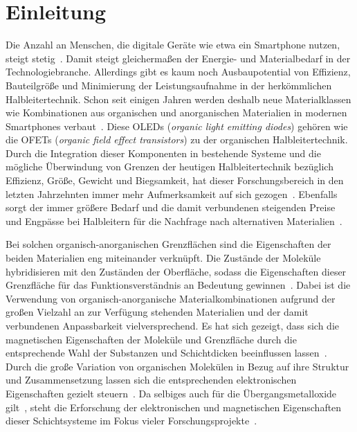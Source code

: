 \chapter{Einleitung}
    Die Anzahl an Menschen, die digitale Geräte wie etwa ein Smartphone nutzen, steigt stetig~\cite{Statista}.
    Damit steigt gleichermaßen der Energie- und Materialbedarf in der Technologiebranche.
    Allerdings gibt es kaum noch Ausbaupotential von Effizienz, Bauteilgröße und Minimierung der Leistungsaufnahme in der herkömmlichen Halbleitertechnik.
    Schon seit einigen Jahren werden deshalb neue Materialklassen wie Kombinationen aus organischen und anorganischen Materialien in modernen Smartphones verbaut~\cite{MAC}.
    Diese OLEDs (\textit{organic light emitting diodes}) gehören wie die OFETs (\textit{organic field effect transistors}) zu der organischen Halbleitertechnik.
    Durch die Integration dieser Komponenten in bestehende Systeme und die mögliche Überwindung von Grenzen der heutigen Halbleitertechnik bezüglich Effizienz, Größe, Gewicht und Biegsamkeit, hat dieser Forschungsbereich in den letzten Jahrzehnten immer mehr Aufmerksamkeit auf sich gezogen~\cite{Uni-Tübingen, IF_15, IF_1}.
    Ebenfalls sorgt der immer größere Bedarf und die damit verbundenen steigenden Preise und Engpässe bei Halbleitern für die Nachfrage nach alternativen Materialien~\cite{Idealo}.

    Bei solchen organisch-anorganischen Grenzflächen sind die Eigenschaften der beiden Materialien eng miteinander verknüpft.
    Die Zustände der Moleküle hybridisieren mit den Zuständen der Oberfläche, sodass die Eigenschaften dieser Grenzfläche für das Funktionsverständnis an Bedeutung gewinnen~\cite{5A_12, kroemer_nobel_2001, 5A_1}.
    Dabei ist die Verwendung von organisch-anorganische Materialkombinationen aufgrund der großen Vielzahl an zur Verfügung stehenden Materialien und der damit verbundenen Anpassbarkeit vielversprechend.
    Es hat sich gezeigt, dass sich die magnetischen Eigenschaften der Moleküle und Grenzfläche durch die entsprechende Wahl der Substanzen und Schichtdicken beeinflussen lassen~\cite{IF_16}.
    Durch die große Variation von organischen Molekülen in Bezug auf ihre Struktur und Zusammensetzung lassen sich die entsprechenden elektronischen Eigenschaften gezielt steuern~\cite{scholl_chapter_2018}.
    Da selbiges auch für die Übergangsmetalloxide gilt~\cite{5A_4}, steht die Erforschung der elektronischen und magnetischen Eigenschaften dieser Schichtsysteme im Fokus vieler Forschungsprojekte~\cite{SINFONIA, Research, Jülich}.


